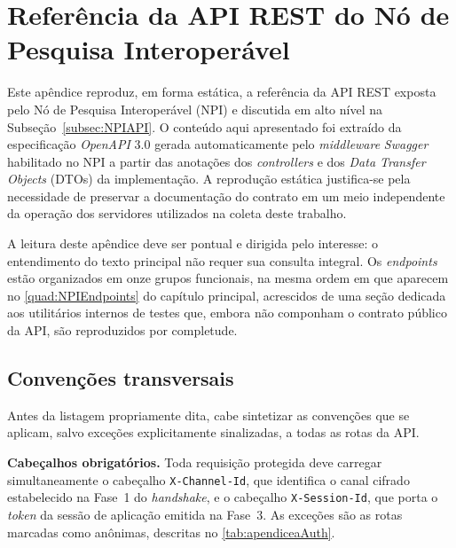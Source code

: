 
\chapter{Referência da API REST do Nó de Pesquisa Interoperável}\label{cap:apendicea}

Este apêndice reproduz, em forma estática, a referência da API REST exposta pelo Nó de Pesquisa Interoperável (NPI) e discutida em alto nível na Subseção~\ref{subsec:NPIAPI}. O conteúdo aqui apresentado foi extraído da especificação \textit{OpenAPI} 3.0 gerada automaticamente pelo \textit{middleware} \textit{Swagger} habilitado no NPI a partir das anotações dos \textit{controllers} e dos \textit{Data Transfer Objects} (DTOs) da implementação. A reprodução estática justifica-se pela necessidade de preservar a documentação do contrato em um meio independente da operação dos servidores utilizados na coleta deste trabalho.

A leitura deste apêndice deve ser pontual e dirigida pelo interesse: o entendimento do texto principal não requer sua consulta integral. Os \textit{endpoints} estão organizados em onze grupos funcionais, na mesma ordem em que aparecem no \autoref{quad:NPIEndpoints} do capítulo principal, acrescidos de uma seção dedicada aos utilitários internos de testes que, embora não componham o contrato público da API, são reproduzidos por completude.

\section{Convenções transversais}\label{sec:apendiceaConvencoes}

Antes da listagem propriamente dita, cabe sintetizar as convenções que se aplicam, salvo exceções explicitamente sinalizadas, a todas as rotas da API.

\textbf{Cabeçalhos obrigatórios.} Toda requisição protegida deve carregar simultaneamente o cabeçalho \texttt{X-Channel-Id}, que identifica o canal cifrado estabelecido na Fase~1 do \textit{handshake}, e o cabeçalho \texttt{X-Session-Id}, que porta o \textit{token} da sessão de aplicação emitida na Fase~3. As exceções são as rotas marcadas como anônimas, descritas no \autoref{tab:apendiceaAuth}.

